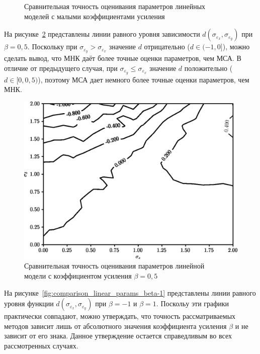 \begin{figure}[p]
  \vspace{\baselineskip}
  \caption{%
    Сравнительная точность оценивания параметров линейных \\
    моделей с малыми коэффициентами усиления
  }\label{fig:comparison_linear_params_beta-small}
\end{figure}

На рисунке~\ref{fig:comparison_linear_params_beta-0,5}
представлены линии равного уровня зависимости \( d(\sigma_{\varepsilon_x}, \sigma_{\varepsilon_y}) \)
при \( \beta = 0{,}5 \).
Поскольку при \( \sigma_{\varepsilon_y} > \sigma_{\varepsilon_x} \)
значение \( d \) отрицательно (\( d \in ( -1, 0 ] \)),
можно сделать вывод, что МНК даёт более точные оценки параметров, чем МСА.
В отличие от предыдущего случая,
при \( \sigma_{\varepsilon_y} \le \sigma_{\varepsilon_x} \)
значение \( d \) положительно (\( d \in [0, 0{,}5 ) \)),
поэтому МСА дает немного более точные оценки параметров, чем МНК.

\begin{figure}[t]
  \centering
  \includegraphics[width=135mm]{fig/linear/param/beta-0,5_param.png}
  \caption{%
    Сравнительная точность оценивания параметров линейной \\
    модели с коэффициентом усиления \( \beta = 0{,}5 \)
  }\label{fig:comparison_linear_params_beta-0,5}
\end{figure}

\pagebreak
На рисунке~\ref{fig:comparison_linear_params_beta-1}
представлены линии равного уровня функции \( d(\sigma_{\varepsilon_x}, \sigma_{\varepsilon_y}) \)
при \( \beta = -1 \) и \( \beta = 1 \).
Поскольу эти {\color{red} графики} практически совпадают, можно утверждать, что точность рассматриваемых
методов зависит лишь от абсолютного значения коэффициента усиления \( \beta \) и
не зависит от его знака.
Данное утверждение остается справедливым во всех рассмотренных случаях.

